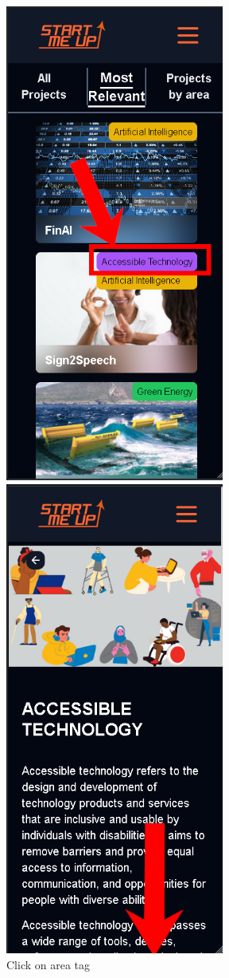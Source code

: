 \documentclass[11pt, letterpaper]{article}
\begin{document}
\begin{figure}[H]
  \centering
  \begin{minipage}[b]{0.4\textwidth}
    \includegraphics[width=7.2cm]{images/Scenarios/Scenario4/Screen7.png}
    \caption{Click on area tag}
    \label{fig:scenario4_7}
  \end{minipage}
  \hfill
  \begin{minipage}[b]{0.4\textwidth}
    \includegraphics[width=7.2cm]{images/Scenarios/Scenario4/Screen8.png}

\end{minipage}
\end{figure}
\end{document}
